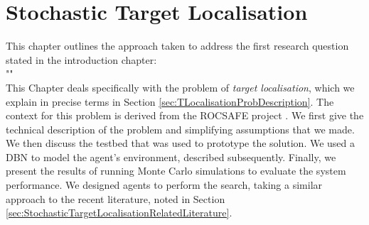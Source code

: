 
\chapter{Stochastic Target Localisation}\label{chap:targetLocalisation}
This chapter outlines the approach taken to address the first research question stated in the introduction chapter:
\\
"\textit{}"
\\
This Chapter deals specifically with the problem of \textit{target localisation}, which we explain in precise terms in Section \ref{sec:TLocalisationProbDescription}. The context for this problem is derived from the ROCSAFE project \cite{Bagherzadeh2017ROCSAFE:Incidents}. We first give the technical description of the problem and simplifying assumptions that we made. We then discuss the testbed that was used to prototype the solution. We used a DBN to model the agent's environment, described subsequently. Finally, we present the results of running Monte Carlo simulations to evaluate the system performance. We designed agents to perform the search, taking a similar approach to the recent literature, noted in Section \ref{sec:StochasticTargetLocalisationRelatedLiterature}.











\label{sec:SimulationResults}

